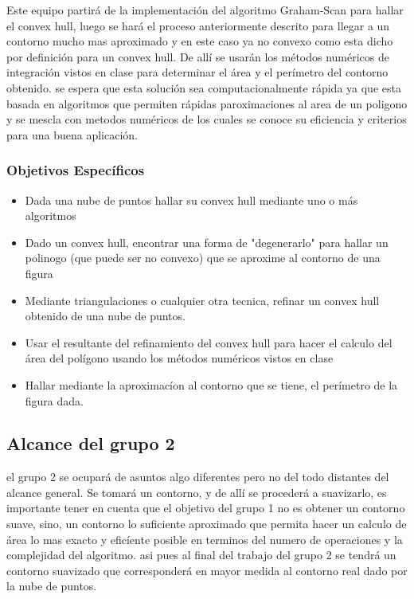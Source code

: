 \documentclass[final, 12pt letterpaper]{article}
\begin{document}
Este equipo partirá de la implementación del algoritmo Graham-Scan para hallar el convex hull, luego se hará el proceso anteriormente descrito para llegar  a un contorno mucho mas aproximado y en este caso ya no convexo como esta dicho por definición para un convex hull. De allí se usarán los métodos numéricos de integración  vistos en clase para determinar el área y el perímetro del contorno obtenido. se espera que esta solución sea computacionalmente rápida ya que esta basada en algoritmos que permiten rápidas paroximaciones al area de un poligono y se mescla con metodos numéricos de los cuales se conoce su eficiencia y criterios para una buena aplicación.

\subsubsection*{Objetivos Específicos}
 \begin{itemize}
\item Dada una nube de puntos hallar su convex hull mediante uno o más algoritmos
\item Dado un convex hull, encontrar una forma de "degenerarlo" para hallar un polinogo (que puede ser no convexo) que se aproxime al contorno de una figura
\item Mediante triangulaciones o cualquier otra tecnica, refinar un convex hull obtenido de una nube de puntos.
\item Usar el resultante del refinamiento del convex hull para hacer el calculo del área del polígono usando los métodos numéricos vistos en clase
\item Hallar mediante la aproximacíon al contorno que se tiene, el perímetro de la figura dada.
\end{itemize}

\subsection{Alcance del grupo 2}

el grupo 2 se ocupará de asuntos algo diferentes pero no del todo distantes del alcance general. Se tomará un contorno, y de allí se procederá a suavizarlo, es importante tener en cuenta que el objetivo del grupo 1 no es obtener un contorno suave, sino, un contorno lo suficiente aproximado que permita hacer un calculo de área lo mas exacto y eficíente posible en terminos del numero de operaciones y la complejidad del algoritmo. asi pues al final del trabajo del grupo 2 se tendrá un contorno suavizado que corresponderá en mayor medida al contorno real dado por la nube de puntos.
\end{document}
